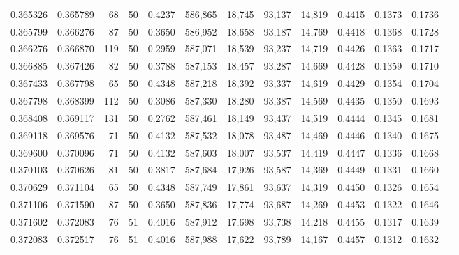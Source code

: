 \begin{tabular}{rrrrrrrrrrrrr}
0.365326 & 0.365789 &    68 &  50 &                                     0.4237 & 586,865 &  18,745 &  93,137 &  14,819 & 0.4415 & 0.1373 & 0.1736 \\
0.365799 & 0.366276 &    87 &  50 &                                     0.3650 & 586,952 &  18,658 &  93,187 &  14,769 & 0.4418 & 0.1368 & 0.1728 \\
0.366276 & 0.366870 &   119 &  50 &                                     0.2959 & 587,071 &  18,539 &  93,237 &  14,719 & 0.4426 & 0.1363 & 0.1717 \\
0.366885 & 0.367426 &    82 &  50 &                                     0.3788 & 587,153 &  18,457 &  93,287 &  14,669 & 0.4428 & 0.1359 & 0.1710 \\
0.367433 & 0.367798 &    65 &  50 &                                     0.4348 & 587,218 &  18,392 &  93,337 &  14,619 & 0.4429 & 0.1354 & 0.1704 \\
0.367798 & 0.368399 &   112 &  50 &                                     0.3086 & 587,330 &  18,280 &  93,387 &  14,569 & 0.4435 & 0.1350 & 0.1693 \\
0.368408 & 0.369117 &   131 &  50 &                                     0.2762 & 587,461 &  18,149 &  93,437 &  14,519 & 0.4444 & 0.1345 & 0.1681 \\
0.369118 & 0.369576 &    71 &  50 &                                     0.4132 & 587,532 &  18,078 &  93,487 &  14,469 & 0.4446 & 0.1340 & 0.1675 \\
0.369600 & 0.370096 &    71 &  50 &                                     0.4132 & 587,603 &  18,007 &  93,537 &  14,419 & 0.4447 & 0.1336 & 0.1668 \\
0.370103 & 0.370626 &    81 &  50 &                                     0.3817 & 587,684 &  17,926 &  93,587 &  14,369 & 0.4449 & 0.1331 & 0.1660 \\
0.370629 & 0.371104 &    65 &  50 &                                     0.4348 & 587,749 &  17,861 &  93,637 &  14,319 & 0.4450 & 0.1326 & 0.1654 \\
0.371106 & 0.371590 &    87 &  50 &                                     0.3650 & 587,836 &  17,774 &  93,687 &  14,269 & 0.4453 & 0.1322 & 0.1646 \\
0.371602 & 0.372083 &    76 &  51 &                                     0.4016 & 587,912 &  17,698 &  93,738 &  14,218 & 0.4455 & 0.1317 & 0.1639 \\
0.372083 & 0.372517 &    76 &  51 &                                     0.4016 & 587,988 &  17,622 &  93,789 &  14,167 & 0.4457 & 0.1312 & 0.1632 \\

\end{tabular}
